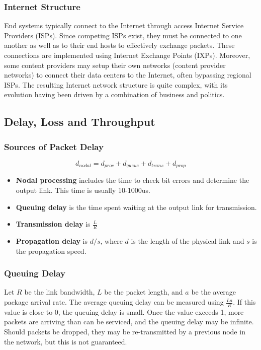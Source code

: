 \documentclass[12pt,titlepage]{article}
\begin{document}
      \subsubsection{Internet Structure}
        End systems typically connect to the Internet through access Internet Service Providers (ISPs). Since competing ISPs exist, they must be
        connected to one another as well as to their end hosts to effectively exchange packets. These connections are implemented using Internet Exchange
        Points (IXPs). Moreover, some content providers may setup their own networks (content provider networks) to connect their data centers to the Internet,
        often bypassing regional ISPs. The resulting Internet network structure is quite complex, with its evolution having been driven by a
        combination of business and politics.

    \subsection{Delay, Loss and Throughput}
      \subsubsection{Sources of Packet Delay}
        $$d_{nodal} = d_{proc} + d_{queue} + d_{trans} + d_{prop}$$
      
        \begin{itemize}
          \item \textbf{Nodal processing} includes the time to check bit errors and determine the output link. This time is usually 10-1000us.
          \item \textbf{Queuing delay} is the time spent waiting at the output link for transmission.
          \item \textbf{Transmission delay} is $\frac{L}{R}$
          \item \textbf{Propagation delay} is $d/s$, where $d$ is the length of the physical link and $s$ is the propagation speed.
        \end{itemize}

      \subsubsection{Queuing Delay}
        Let $R$ be the link bandwidth, $L$ be the packet length, and $a$ be the average package arrival rate. The average queuing delay
        can be measured using $\frac{La}{R}$. If this value is close to 0, the queuing delay is small. Once the value exceeds 1, more
        packets are arriving than can be serviced, and the queuing delay may be infinite. Should packets be dropped, they may be
        re-transmitted by a previous node in the network, but this is not guaranteed.
\end{document}
